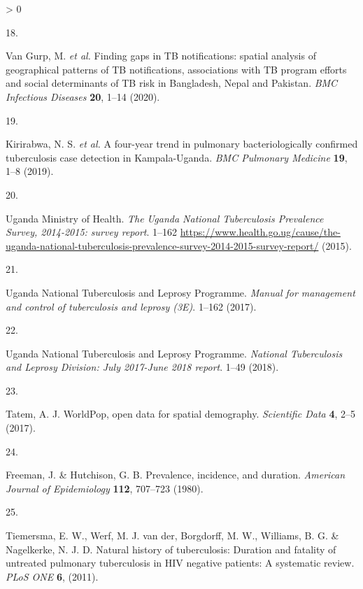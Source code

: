 \documentclass[
]{article}
\newlength{\cslhangindent}
\newlength{\csllabelwidth}
\newenvironment{CSLReferences}[2] %
 {%
  \setlength{\parindent}{0pt}
  \ifodd #1 \everypar{\setlength{\hangindent}{\cslhangindent}}\ignorespaces\fi
  \ifnum #2 > 0
  \setlength{\parskip}{#2\baselineskip}
  \fi
 }%
 {}
\newcommand{\CSLLeftMargin}[1]{\parbox[t]{\csllabelwidth}{#1}}
\newcommand{\CSLRightInline}[1]{\parbox[t]{\linewidth - \csllabelwidth}{#1}\break}
\begin{document}
\begin{CSLReferences}{0}{0}
\leavevmode\hypertarget{ref-VanGurp2020}{}%
\CSLLeftMargin{18. }
\CSLRightInline{Van Gurp, M. \emph{et al.} {Finding gaps in TB notifications: spatial analysis of geographical patterns of TB notifications, associations with TB program efforts and social determinants of TB risk in Bangladesh, Nepal and Pakistan}. \emph{BMC Infectious Diseases} \textbf{20}, 1--14 (2020).}

\leavevmode\hypertarget{ref-Kirirabwa2019}{}%
\CSLLeftMargin{19. }
\CSLRightInline{Kirirabwa, N. S. \emph{et al.} {A four-year trend in pulmonary bacteriologically confirmed tuberculosis case detection in Kampala-Uganda}. \emph{BMC Pulmonary Medicine} \textbf{19}, 1--8 (2019).}

\leavevmode\hypertarget{ref-UgandaMinistryofHealth2015}{}%
\CSLLeftMargin{20. }
\CSLRightInline{Uganda Ministry of Health. \emph{{The Uganda National Tuberculosis Prevalence Survey, 2014-2015: survey report}}. 1--162 \url{https://www.health.go.ug/cause/the-uganda-national-tuberculosis-prevalence-survey-2014-2015-survey-report/} (2015).}

\leavevmode\hypertarget{ref-UgandaNationalTuberculosisandLeprosyProgramme2017}{}%
\CSLLeftMargin{21. }
\CSLRightInline{Uganda National Tuberculosis and Leprosy Programme. \emph{{Manual for management and control of tuberculosis and leprosy (3E)}}. 1--162 (2017).}

\leavevmode\hypertarget{ref-UgandaNationalTuberculosisandLeprosyProgramme2018}{}%
\CSLLeftMargin{22. }
\CSLRightInline{Uganda National Tuberculosis and Leprosy Programme. \emph{{National Tuberculosis and Leprosy Division: July 2017-June 2018 report}}. 1--49 (2018).}

\leavevmode\hypertarget{ref-Tatem2017}{}%
\CSLLeftMargin{23. }
\CSLRightInline{Tatem, A. J. {WorldPop, open data for spatial demography}. \emph{Scientific Data} \textbf{4}, 2--5 (2017).}

\leavevmode\hypertarget{ref-Freeman1980}{}%
\CSLLeftMargin{24. }
\CSLRightInline{Freeman, J. \& Hutchison, G. B. {Prevalence, incidence, and duration}. \emph{American Journal of Epidemiology} \textbf{112}, 707--723 (1980).}

\leavevmode\hypertarget{ref-Tiemersma2011}{}%
\CSLLeftMargin{25. }
\CSLRightInline{Tiemersma, E. W., Werf, M. J. van der, Borgdorff, M. W., Williams, B. G. \& Nagelkerke, N. J. D. {Natural history of tuberculosis: Duration and fatality of untreated pulmonary tuberculosis in HIV negative patients: A systematic review}. \emph{PLoS ONE} \textbf{6}, (2011).}


\end{CSLReferences}
\end{document}
